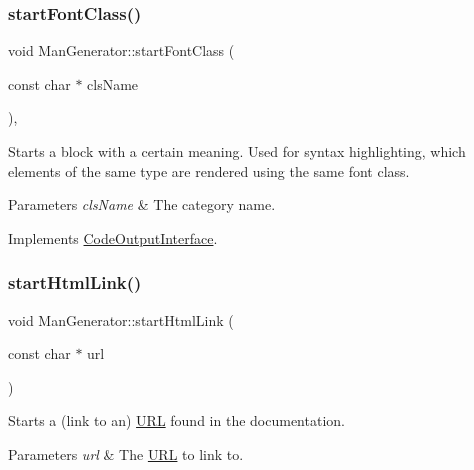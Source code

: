\mbox{\label{class_man_generator_a4bafda26799458d289c507fad6690de9}} 
\subsubsection{\texorpdfstring{startFontClass()}{startFontClass()}}
{\footnotesize\ttfamily void Man\+Generator\+::start\+Font\+Class (\begin{DoxyParamCaption}\item[{const char $\ast$}]{cls\+Name }\end{DoxyParamCaption})\hspace{0.3cm}{\ttfamily [inline]}, {\ttfamily [virtual]}}

Starts a block with a certain meaning. Used for syntax highlighting, which elements of the same type are rendered using the same \textquotesingle{}font class\textquotesingle{}. 
\begin{DoxyParams}{Parameters}
{\em cls\+Name} & The category name. \\
\hline
\end{DoxyParams}


Implements \mbox{\hyperlink{class_code_output_interface_ac90f75968cdcf127e0b02938bdb49d87}{Code\+Output\+Interface}}.

\mbox{\label{class_man_generator_a605e678d3be65519e6b94dff6e403e79}} 
\subsubsection{\texorpdfstring{startHtmlLink()}{startHtmlLink()}}
{\footnotesize\ttfamily void Man\+Generator\+::start\+Html\+Link (\begin{DoxyParamCaption}\item[{const char $\ast$}]{url }\end{DoxyParamCaption})\hspace{0.3cm}{\ttfamily [virtual]}}

Starts a (link to an) \mbox{\hyperlink{struct_u_r_l}{U\+RL}} found in the documentation. 
\begin{DoxyParams}{Parameters}
{\em url} & The \mbox{\hyperlink{struct_u_r_l}{U\+RL}} to link to. \\
\hline
\end{DoxyParams}


